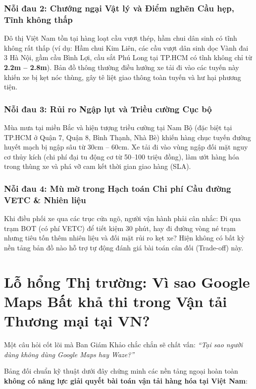 \documentclass[11pt,a4paper]{article}
\begin{document}
\subsubsection{Nỗi đau 2: Chướng ngại Vật lý và Điểm nghẽn Cầu hẹp, Tĩnh không thấp}
Đô thị Việt Nam tồn tại hàng loạt cầu vượt thép, hầm chui dân sinh có tĩnh không rất thấp (ví dụ: Hầm chui Kim Liên, các cầu vượt dân sinh dọc Vành đai 3 Hà Nội, gầm cầu Bình Lợi, cầu sắt Phú Long tại TP.HCM có tĩnh không chỉ từ \textbf{2.2m -- 2.8m}). Bản đồ thông thường điều hướng xe tải đi vào các tuyến này khiến xe bị kẹt nóc thùng, gây tê liệt giao thông toàn tuyến và hư hại phương tiện.

\subsubsection{Nỗi đau 3: Rủi ro Ngập lụt và Triều cường Cục bộ}
Mùa mưa tại miền Bắc và hiện tượng triều cường tại Nam Bộ (đặc biệt tại TP.HCM ở Quận 7, Quận 8, Bình Thạnh, Nhà Bè) khiến hàng chục tuyến đường huyết mạch bị ngập sâu từ 30cm -- 60cm. Xe tải đi vào vùng ngập đối mặt nguy cơ thủy kích (chi phí đại tu động cơ từ 50--100 triệu đồng), làm ướt hàng hóa trong thùng xe và phá vỡ cam kết thời gian giao hàng (SLA).

\subsubsection{Nỗi đau 4: Mù mờ trong Hạch toán Chi phí Cầu đường VETC \& Nhiên liệu}
Khi điều phối xe qua các trục cửa ngõ, người vận hành phải cân nhắc: Đi qua trạm BOT (có phí VETC) để tiết kiệm 30 phút, hay đi đường vòng né trạm nhưng tiêu tốn thêm nhiên liệu và đối mặt rủi ro kẹt xe? Hiện không có bất kỳ nền tảng bản đồ nào hỗ trợ tự động đánh giá bài toán cân đối (Trade-off) này.

\section{Lỗ hổng Thị trường: Vì sao Google Maps Bất khả thi trong Vận tải Thương mại tại VN?}

Một câu hỏi cốt lõi mà Ban Giám Khảo chắc chắn sẽ chất vấn: \textit{``Tại sao người dùng không dùng Google Maps hay Waze?''}

Bảng đối chuẩn kỹ thuật dưới đây chứng minh các nền tảng ngoại hoàn toàn \textbf{không có năng lực giải quyết bài toán vận tải hàng hóa tại Việt Nam}:
\end{document}

